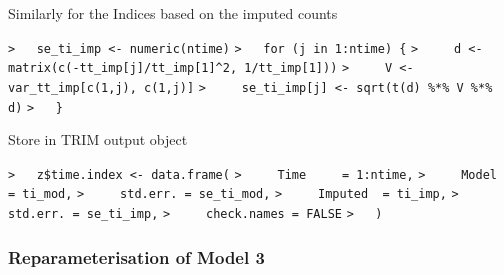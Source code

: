 \documentclass[a4paper]{article}
\begin{document}
Similarly for the Indices based on the imputed counts\par
\verb~>   se_ti_imp <- numeric(ntime)~\newline
\verb~>   for (j in 1:ntime) {~\newline
\verb~>     d <- matrix(c(-tt_imp[j]/tt_imp[1]^2, 1/tt_imp[1]))~\newline
\verb~>     V <- var_tt_imp[c(1,j), c(1,j)]~\newline
\verb~>     se_ti_imp[j] <- sqrt(t(d) %*% V %*% d)~\newline
\verb~>   }~\par

Store in TRIM output object\par
\verb~>   z$time.index <- data.frame(~\newline
\verb~>     Time     = 1:ntime,~\newline
\verb~>     Model    = ti_mod,~\newline
\verb~>     std.err. = se_ti_mod,~\newline
\verb~>     Imputed  = ti_imp,~\newline
\verb~>     std.err. = se_ti_imp,~\newline
\verb~>     check.names = FALSE~\newline
\verb~>   )~\par



\subsubsection{Reparameterisation of Model 3}\par
\end{document}
